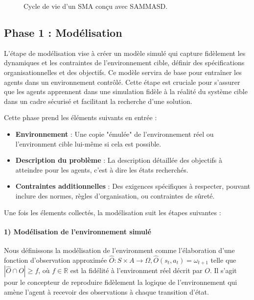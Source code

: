 \documentclass[sigconf,anonymous]{aamas}
\begin{document}
\begin{figure*}[h!]
  \centering
  
  \caption{Cycle de vie d'un SMA conçu avec SAMMASD.}
  \label{fig:cycle}
\end{figure*}

\subsection{Phase 1 : Modélisation}

L'étape de modélisation vise à créer un modèle simulé qui capture fidèlement les dynamiques et les contraintes de l'environnement cible, définir des spécifications organisationnelles et des objectifs. Ce modèle servira de base pour entraîner les agents dans un environnement contrôlé. Cette étape est cruciale pour s'assurer que les agents apprennent dans une simulation fidèle à la réalité du système cible dans un cadre sécurisé et facilitant la recherche d'une solution. %

Cette phase prend les éléments suivants en entrée :
\begin{itemize}
    \item \textbf{Environnement} : Une copie "émulée" de l'environnement réel ou l'environment cible lui-même si cela est possible.
    \item \textbf{Description du problème} : La description détaillée des objectifs à atteindre pour les agents, c'est à dire les états recherchés.
    \item \textbf{Contraintes additionnelles} : Des exigences spécifiques à respecter, pouvant inclure des normes, règles d'organisation, ou contraintes de sûreté.
\end{itemize}

Une fois les élements collectés, la modélisation suit les étapes suivantes : 


\paragraph{\textbf{1) Modélisation de l'environnement simulé}} \quad

\noindent Nous définissons la modélisation de l'environment comme l'élaboration d'une fonction d'observation approximée $\hat{O}: S \times A \to \Omega, \hat{O}(s_t,a_t) = \omega_{t+1}$ telle que $|\hat{O} \cap O| \geq f$, où $f \in \mathbb{R}$ est la fidélité à l'environment réel décrit par $O$.
Il s'agit pour le concepteur de reproduire fidèlement la logique de l'environnement qui amène l'agent à recevoir des observations à chaque transition d'état. 
\end{document}

